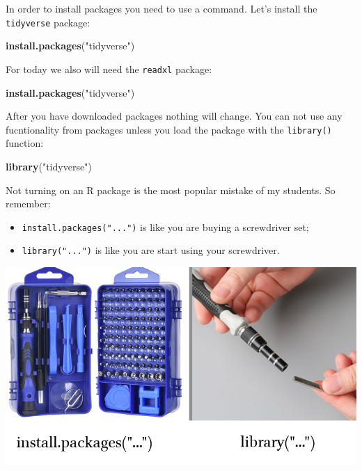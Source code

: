 \documentclass[
]{book}
\newenvironment{Shaded}{\begin{snugshade}}{\end{snugshade}}
\newcommand{\KeywordTok}[1]{\textcolor[rgb]{0.13,0.29,0.53}{\textbf{#1}}}
\newcommand{\NormalTok}[1]{#1}
\newcommand{\StringTok}[1]{\textcolor[rgb]{0.31,0.60,0.02}{#1}}
\providecommand{\tightlist}{%
  \setlength{\itemsep}{0pt}\setlength{\parskip}{0pt}}
\begin{document}
In order to install packages you need to use a command. Let's install the \texttt{tidyverse} package:

\begin{Shaded}
\begin{Highlighting}[]
\KeywordTok{install.packages}\NormalTok{(}\StringTok{"tidyverse"}\NormalTok{)}
\end{Highlighting}
\end{Shaded}

For today we also will need the \texttt{readxl} package:

\begin{Shaded}
\begin{Highlighting}[]
\KeywordTok{install.packages}\NormalTok{(}\StringTok{"tidyverse"}\NormalTok{)}
\end{Highlighting}
\end{Shaded}

After you have downloaded packages nothing will change. You can not use any fucntionality from packages unless you load the package with the \texttt{library()} function:

\begin{Shaded}
\begin{Highlighting}[]
\KeywordTok{library}\NormalTok{(}\StringTok{"tidyverse"}\NormalTok{)}
\end{Highlighting}
\end{Shaded}

Not turning on an R package is the most popular mistake of my students. So remember:

\begin{itemize}
\tightlist
\item
  \texttt{install.packages("...")} is like you are buying a screwdriver set;
\item
  \texttt{library("...")} is like you are start using your screwdriver.
\end{itemize}

\includegraphics{images/01.05.install-packages-vs-library.png}
\end{document}
